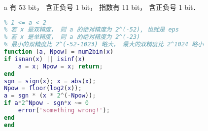 
a 有 53 bit， 含正负号 1 bit， 指数有 11 bit， 含正负号 1 bit．

\begin{lstlisting}[language=matlab]
% x = a*2^Npw (exactly)
% 1 <= a < 2
% 若 x 是双精度， 则 a 的绝对精度为 2^(-52), 也就是 eps
% 若 x 是单精度， 则 a 的绝对精度为 2^(-23)
% 最小的双精度比 2^(-52-1023) 略大， 最大的双精度比 2^1024 略小
function [a, Npow] = num2bin(x)
if isnan(x) || isinf(x)
    a = x; Npow = x; return;
end
sgn = sign(x); x = abs(x);
Npow = floor(log2(x));
a = sgn * (x * 2^(-Npow));
if a*2^Npow - sgn*x ~= 0
    error('something wrong!');
end
end
\end{lstlisting}
